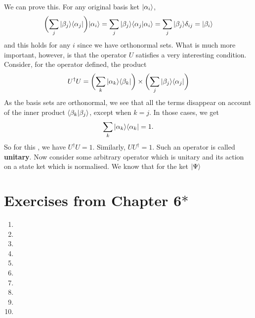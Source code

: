 We can prove this. For any original basis ket $|\alpha_{i}\rangle$,
$$
\biggl(\sum_{j}|\beta_{j}\rangle\langle\alpha_{j}|\biggr)|\alpha_{i}\rangle=\sum_{j}|\beta_{j}\rangle\langle\alpha_{j}|\alpha_{i}\rangle=\sum_{j}|\beta_{j}\rangle\delta_{ij}=|\beta_{i}\rangle
$$
and this holds for any $i$ since we have orthonormal sets. What is much more important, however, is that the operator $U$ satisfies a very interesting condition. Consider, for the operator defined, the product
$$
U^\dagger U=\biggl(\sum_{k}|\alpha_{k}\rangle\langle\beta_{k}|\biggr)\times\biggl(\sum_{j}|\beta_{j}\rangle\langle\alpha_{j}|\biggr)
$$
As the basis sets are orthonormal, we see that all the terms disappear on account of the inner product $\langle\beta_{k}|\beta_{j}\rangle$, except when $k=j$. In those cases, we get 
$$
\sum_{k}|\alpha_{k}\rangle\langle\alpha_{k}|=1.
$$
So for this , we have $U^{\dagger}U=1$. Similarly, $U U^{\dagger}=1$. Such an operator is called \textbf{unitary}. Now consider some arbitrary operator which is unitary and its action on a state ket which is normalised. We know that for the ket $|\Psi
\rangle$
\section{Exercises from Chapter 6$\ast$}
\begin{enumerate}
    \item 
    \item
    \item
    \item
    \item
    \item
    \item
    \item
    \item
    \item
\end{enumerate}